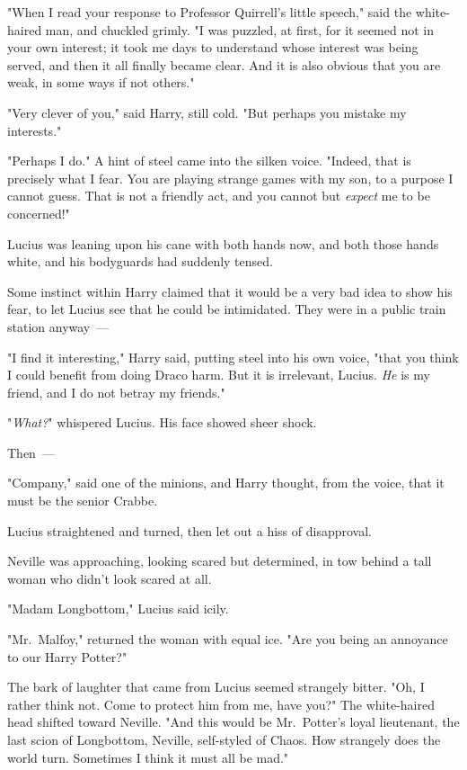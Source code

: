 "When I read your response to Professor Quirrell's little speech," said the
white-haired man, and chuckled grimly. "I was puzzled, at first, for it seemed
not in your own interest; it took me days to understand whose interest was
being served, and then it all finally became clear. And it is also obvious that
you are weak, in some ways if not others."

"Very clever of you," said Harry, still cold. "But perhaps you mistake my
interests."

"Perhaps I do." A hint of steel came into the silken voice. "Indeed, that is
precisely what I fear. You are playing strange games with my son, to a purpose
I cannot guess. That is not a friendly act, and you cannot but \emph{expect} me
to be concerned!"

Lucius was leaning upon his cane with both hands now, and both those hands
white, and his bodyguards had suddenly tensed.

Some instinct within Harry claimed that it would be a very bad idea to show his
fear, to let Lucius see that he could be intimidated. They were in a public
train station anyway~---

"I find it interesting," Harry said, putting steel into his own voice, "that
you think I could benefit from doing Draco harm. But it is irrelevant, Lucius.
\emph{He} is my friend, and I do not betray my friends."

"\emph{What?}" whispered Lucius. His face showed sheer shock.

Then~---

"Company," said one of the minions, and Harry thought, from the voice, that it
must be the senior Crabbe.

Lucius straightened and turned, then let out a hiss of disapproval.

Neville was approaching, looking scared but determined, in tow behind a tall
woman who didn't look scared at all.

"Madam Longbottom," Lucius said icily.

"Mr.~Malfoy," returned the woman with equal ice. "Are you being an annoyance to
our Harry Potter?"

The bark of laughter that came from Lucius seemed strangely bitter. "Oh, I
rather think not. Come to protect him from me, have you?" The white-haired head
shifted toward Neville. "And this would be Mr.~Potter's loyal lieutenant, the
last scion of Longbottom, Neville, self-styled of Chaos. How strangely does the
world turn. Sometimes I think it must all be mad."

